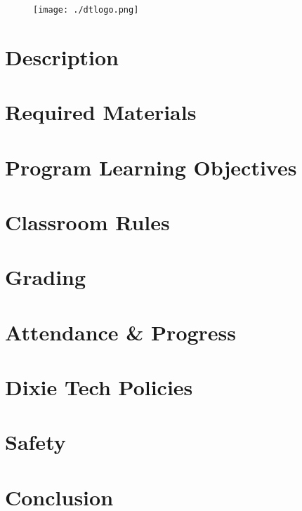 \documentclass{article}
\begin{document}
\begin{figure}[h]
    \centering
    \texttt{[image: ./dtlogo.png]}
\end{figure}


\section*{Description}
\bline


\section*{Required Materials}


\section*{Program Learning Objectives}


\section*{Classroom Rules}


\section*{Grading}
\bline


\section*{Attendance \& Progress}
\bline


\section*{Dixie Tech Policies}
\bline


\section*{Safety}
\bline


\section*{Conclusion}
\bline

\end{document}
